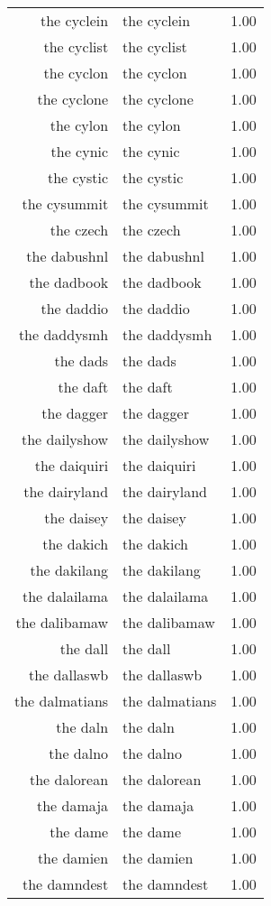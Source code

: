 \begin{table}[ht]
\begin{tabular}{rlr}
  the cyclein & the cyclein & 1.00 \\ 
  the cyclist & the cyclist & 1.00 \\ 
  the cyclon & the cyclon & 1.00 \\ 
  the cyclone & the cyclone & 1.00 \\ 
  the cylon & the cylon & 1.00 \\ 
  the cynic & the cynic & 1.00 \\ 
  the cystic & the cystic & 1.00 \\ 
  the cysummit & the cysummit & 1.00 \\ 
  the czech & the czech & 1.00 \\ 
  the dabushnl & the dabushnl & 1.00 \\ 
  the dadbook & the dadbook & 1.00 \\ 
  the daddio & the daddio & 1.00 \\ 
  the daddysmh & the daddysmh & 1.00 \\ 
  the dads & the dads & 1.00 \\ 
  the daft & the daft & 1.00 \\ 
  the dagger & the dagger & 1.00 \\ 
  the dailyshow & the dailyshow & 1.00 \\ 
  the daiquiri & the daiquiri & 1.00 \\ 
  the dairyland & the dairyland & 1.00 \\ 
  the daisey & the daisey & 1.00 \\ 
  the dakich & the dakich & 1.00 \\ 
  the dakilang & the dakilang & 1.00 \\ 
  the dalailama & the dalailama & 1.00 \\ 
  the dalibamaw & the dalibamaw & 1.00 \\ 
  the dall & the dall & 1.00 \\ 
  the dallaswb & the dallaswb & 1.00 \\ 
  the dalmatians & the dalmatians & 1.00 \\ 
  the daln & the daln & 1.00 \\ 
  the dalno & the dalno & 1.00 \\ 
  the dalorean & the dalorean & 1.00 \\ 
  the damaja & the damaja & 1.00 \\ 
  the dame & the dame & 1.00 \\ 
  the damien & the damien & 1.00 \\ 
  the damndest & the damndest & 1.00 \\ 

\end{tabular}
\end{table}
